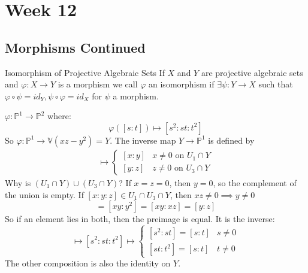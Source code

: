 \documentclass{report}
\begin{document}
\chapter{Week 12}

\begin{topic}
    \section{Morphisms Continued}
\end{topic}

\begin{definition}{Isomorphism of Projective Algebraic Sets}
    If $X$ and $Y$ are projective algebraic sets and $\varphi : X \rightarrow Y$ is a morphism we call $\varphi$ an isomorphism if $\exists \psi : Y \rightarrow X$ such that $\varphi \circ \psi = id_{Y}, \psi \circ \varphi = id_{X}$ for $\psi$ a morphism.
\end{definition} 

\begin{examples}
    \begin{example}
        $\varphi : \mathbb{P}^{1} \rightarrow \mathbb{P}^{2}$ where:
            \begin{equation*}
                \varphi ([s: t]) \mapsto [s^{2} : st : t^{2}]
            \end{equation*}
        So $\varphi : \mathbb{P}^{1} \rightarrow \mathbb{V}(xz - y^{2}) = Y$. The inverse map $Y \rightarrow \mathbb{P}^{1}$ is defined by
            \begin{align*}
                 [x : y : z] \mapsto
                     \begin{cases}
                         [x : y] & x \neq 0 \text{ on $U_{1} \cap Y$} \\
                         [y : z] & z \neq 0 \text{ on $U_{3} \cap Y$}  
                     \end{cases}
            \end{align*}
        Why is $(U_{1} \cap Y)\cup (U_{3} \cap Y)$? If $x = z = 0$, then $y = 0$, so the complement of the union is empty. If $[x : y : z] \in U_{1} \cap U_{3} \cap Y$, then $xz \neq 0 \implies y \neq 0$
            \begin{equation*}
                [x : y] = [xy : y^{2}] = [xy : xz] = [y: z]
            \end{equation*}
        So if an element lies in both, then the preimage is equal. It is the inverse:
            \begin{equation*}
                [s : t] \mapsto [s^{2} : st : t^{2}] \mapsto
                     \begin{cases}
                         [s^{2} : st] = [s : t] & s \neq 0 \\
                         [st : t^{2}]  = [s : t]          & t \neq 0   
                     \end{cases}
            \end{equation*}
        The other composition is also the identity on $Y$.
    \end{example}
\end{examples}
\end{document}
